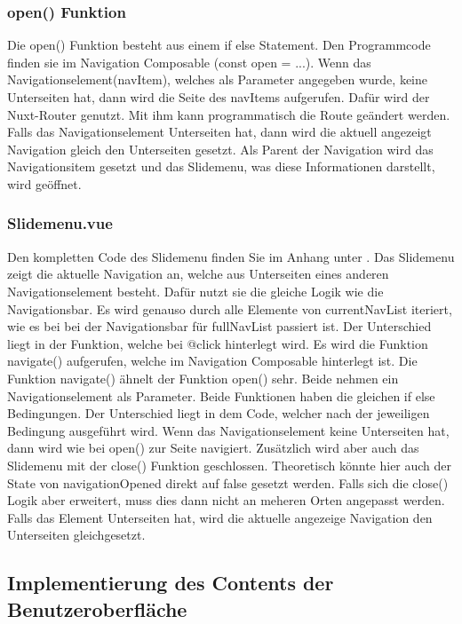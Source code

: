 \subsubsection{open() Funktion}
\label{sec:open() Funktion}

Die open() Funktion besteht aus einem if else Statement. Den Programmcode finden sie im Navigation Composable  (const open = ...). Wenn das Navigationselement(navItem), welches als Parameter angegeben wurde, keine Unterseiten hat, dann wird die Seite des navItems aufgerufen. Dafür wird der Nuxt-Router genutzt. Mit ihm kann programmatisch die Route geändert werden. Falls das Navigationselement Unterseiten hat, dann wird die aktuell angezeigt Navigation gleich den Unterseiten gesetzt. Als Parent der Navigation wird das Navigationsitem gesetzt und das Slidemenu, was diese Informationen darstellt, wird geöffnet.

\subsubsection{Slidemenu.vue}
\label{sec:Slidemenu.vue}

Den kompletten Code des Slidemenu finden Sie im Anhang unter .
Das Slidemenu zeigt die aktuelle Navigation an, welche aus Unterseiten eines anderen Navigationselement besteht. Dafür nutzt sie die gleiche Logik wie die Navigationsbar. Es wird genauso durch alle Elemente von currentNavList iteriert, wie es bei bei der Navigationsbar für fullNavList passiert ist. Der Unterschied liegt in der Funktion, welche bei @click hinterlegt wird. Es wird die Funktion navigate() aufgerufen, welche im Navigation Composable hinterlegt ist. Die Funktion navigate() ähnelt der Funktion open() sehr. Beide nehmen ein Navigationselement als Parameter. Beide Funktionen haben die gleichen if else Bedingungen. Der Unterschied liegt in dem Code, welcher nach der jeweiligen Bedingung ausgeführt wird. Wenn das Navigationselement keine Unterseiten hat, dann wird wie bei open() zur Seite navigiert. Zusätzlich wird aber auch das Slidemenu mit der close() Funktion geschlossen. Theoretisch könnte hier auch der State von navigationOpened direkt auf false gesetzt werden. Falls sich die close() Logik aber erweitert, muss dies dann nicht an meheren Orten angepasst werden. Falls das Element Unterseiten hat, wird die aktuelle angezeige Navigation den Unterseiten gleichgesetzt. 

\subsection{Implementierung des Contents der Benutzeroberfläche}
\label{sec:Implementierung des Contents der ImplementierungBenutzeroberflaeche}

